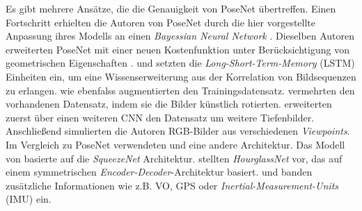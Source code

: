 Es gibt mehrere Ansätze, die die Genauigkeit von PoseNet übertreffen.
Einen Fortschritt erhielten die Autoren von PoseNet durch die hier \cite{kendallModellingUncertaintyDeep2016} vorgestellte Anpassung ihres Modells an einen \textit{Bayessian Neural Network} \cite{denkerTransformingNeuralNetOutput1991}.
Dieselben Autoren erweiterten PoseNet mit einer neuen Kostenfunktion unter Berücksichtigung von geometrischen Eigenschaften \cite{kendallGeometricLossFunctions2017}. \citet{walchImageBasedLocalizationUsing2017} und \citet{clarkVidLocDeepSpatioTemporal2017} setzten die \textit{Long-Short-Term-Memory} (LSTM) \cite{hochreiterLongShortTermMemory1997} Einheiten ein, um eine Wissenserweiterung aus der Korrelation von Bildsequenzen zu erlangen. \citet{wuDelvingDeeperConvolutional2017} wie ebenfalss \citet{naseerDeepRegressionMonocular2017} augmentierten den Trainingsdatensatz. \citet{wuDelvingDeeperConvolutional2017} vermehrten den vorhandenen Datensatz, indem sie die Bilder künstlich rotierten. \citet{naseerDeepRegressionMonocular2017} erweiterten zuerst über einen weiteren CNN den Datensatz um weitere Tiefenbilder. Anschließend simulierten die Autoren RGB-Bilder aus verschiedenen \textit{Viewpoints}. Im Vergleich zu PoseNet verwendeten \citet{mullerSQUEEZEPOSENETIMAGEBASED2017} und \citet{melekhovImageBasedLocalizationUsing2017} eine andere Architektur. 
Das Modell von \citet{mullerSQUEEZEPOSENETIMAGEBASED2017} basierte auf die \textit{SqueezeNet} \cite{iandolaSqueezeNetAlexNetlevelAccuracy2016} Architektur. \citet{melekhovImageBasedLocalizationUsing2017a} stellten \textit{HourglassNet} vor, das auf einem symmetrischen \textit{Encoder-Decoder}-Architektur basiert. \citet{brahmbhattGeometryAwareLearningMaps2018} und \citet{valadaDeepAuxiliaryLearning2018, valadaIncorporatingSemanticGeometric2018} banden zusätzliche Informationen wie z.B. VO, GPS oder \textit{Inertial-Measurement-Units} (IMU) ein. 

